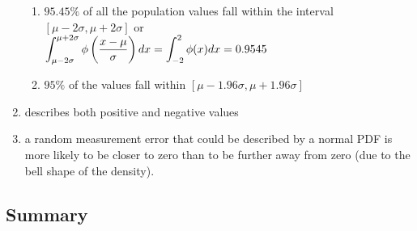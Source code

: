 \begin{enumerate}
\begin{enumerate}
        \item $95.45\%$ of all the population values fall within the interval $[\mu - 2\sigma, \mu + 2\sigma]$ or 
        \hfill \cite{statistics/book/Statistics-for-Data-Scientists/Maurits-Kaptein}
        \\
        $
            \displaystyle\int_{\mu - 2\sigma}^{\mu + 2\sigma}
            \phi\left(\dfrac{x-\mu}{\sigma}\right) dx
            = 
            \displaystyle\int_{-2}^{2}
            \phi(x) dx
            =
            0.9545
        $
        \hfill \cite{statistics/book/Statistics-for-Data-Scientists/Maurits-Kaptein}

        \item $95\%$ of the values fall within $[\mu - 1.96\sigma, \mu + 1.96\sigma]$
        \hfill \cite{statistics/book/Statistics-for-Data-Scientists/Maurits-Kaptein}
    \end{enumerate}

    \item  describes both positive and negative values
    \hfill \cite{statistics/book/Statistics-for-Data-Scientists/Maurits-Kaptein}

    \item a random measurement error that could be described by a normal PDF is more likely to be closer to zero than to be further away from zero (due to the bell shape of the density). 
    \hfill \cite{statistics/book/Statistics-for-Data-Scientists/Maurits-Kaptein}
\end{enumerate}




\subsection{Summary}

